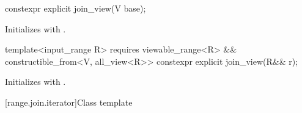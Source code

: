 %
\begin{itemdecl}
constexpr explicit join_view(V base);
\end{itemdecl}

\begin{itemdescr}
\pnum
\effects
Initializes  with .
\end{itemdescr}

%
\begin{itemdecl}
template<input_range R>
  requires viewable_range<R> && constructible_from<V, all_view<R>>
constexpr explicit join_view(R&& r);
\end{itemdecl}

\begin{itemdescr}
\pnum
\effects
Initializes  with .
\end{itemdescr}

[range.join.iterator]{Class template }

